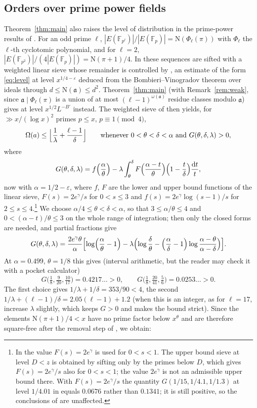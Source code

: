 \documentclass[11pt]{amsart}
\theoremstyle{remark}
\newcommand{\F}{\mathbb{F}}
\newcommand{\N}{\mathrm{N}}
\newcommand{\fa}{\mathfrak{a}}
\newcommand{\dd}{\mathrm{d}}
\newcommand{\e}{\varepsilon}
\begin{document}
\subsection{Orders over prime power fields}
Theorem~\ref{thm:main} also raises the level of distribution in the prime-power results of \cite{Xie}. For an odd prime $\ell$, $|E(\F_{p^\ell})|/|E(\F_p)|=\N(\Phi_\ell(\pi))$ with $\Phi_\ell$ the $\ell$-th cyclotomic polynomial, and for $\ell=2$, $|E(\F_{p^2})|/(4|E(\F_p)|)=\N(\pi+1)/4$. In \cite[\S4]{Xie} these sequences are sifted with a weighted linear sieve whose remainder is controlled by \cite[(4.6)]{Xie}, an estimate of the form \eqref{eq:level} at level $x^{1/4-\e}$ deduced from the Bombieri--Vinogradov theorem over ideals \cite[(4.3)]{Xie} through $d\le\N(\fa)\le d^2$. Theorem~\ref{thm:main} (with Remark~\ref{rem:weak}, since $\fa\mid\Phi_\ell(\pi)$ is a union of at most $(\ell-1)^{\omega(\fa)}$ residue classes modulo $\fa$) gives \cite[(4.6)]{Xie} at level $x^{1/2}L^{-B'}$ instead. The weighted sieve of \cite[(4.7)--(4.9)]{Xie} then yields, for $\gg x/(\log x)^2$ primes $p\le x$, $p\equiv1\pmod 4$,
\[
\Omega(a)\le\Bigl\lfloor\frac1\lambda+\frac{\ell-1}{\delta}\Bigr\rfloor\qquad\text{whenever }0<\theta<\delta<\alpha\text{ and } G(\theta,\delta,\lambda)>0,
\]
where
\[
G(\theta,\delta,\lambda)=f\Bigl(\frac\alpha\theta\Bigr)-\lambda\int_\theta^\delta F\Bigl(\frac{\alpha-t}{\theta}\Bigr)\Bigl(1-\frac t\delta\Bigr)\frac{\dd t}{t},
\]
now with $\alpha=1/2-\e$, where $f$, $F$ are the lower and upper bound functions of the linear sieve, $F(s)=2e^\gamma/s$ for $0<s\le3$ and $f(s)=2e^\gamma\log(s-1)/s$ for $2\le s\le 4$.\footnote{In \cite[(4.11)]{Xie} the value $F(s)=2e^{\gamma}$ is used for $0<s<1$. The upper bound sieve at level $D<z$ is obtained by sifting only by the primes below $D$, which gives $F(s)=2e^{\gamma}/s$ also for $0<s<1$; the value $2e^\gamma$ is not an admissible upper bound there. With $F(s)=2e^\gamma/s$ the quantity $G(1/15,1/4.1,1/1.3)$ at level $1/4.01$ in \cite{Xie} equals $0.0676$ rather than $0.1341$; it is still positive, so the conclusions of \cite[\S4]{Xie} are unaffected.} We choose $\alpha/4\le\theta<\delta<\alpha$, so that $3\le\alpha/\theta\le4$ and $0<(\alpha-t)/\theta\le3$ on the whole range of integration; then only the closed forms are needed, and partial fractions give
\[
G(\theta,\delta,\lambda)=\frac{2e^\gamma\theta}{\alpha}\Bigl[\log\Bigl(\frac\alpha\theta-1\Bigr)-\lambda\Bigl(\log\frac\delta\theta-\Bigl(\frac\alpha\delta-1\Bigr)\log\frac{\alpha-\theta}{\alpha-\delta}\Bigr)\Bigr].
\]
At $\alpha=0.499$, $\theta=1/8$ this gives (interval arithmetic, but the reader may check it with a pocket calculator)
\[
G\bigl(\tfrac18,\tfrac9{20},\tfrac{10}{17}\bigr)= 0.4217\ldots>0,\qquad G\bigl(\tfrac18,\tfrac{20}{41},\tfrac56\bigr)= 0.0253\ldots>0 .
\]
The first choice gives $1/\lambda+1/\delta=353/90<4$, the second $1/\lambda+(\ell-1)/\delta=2.05(\ell-1)+1.2$ (when this is an integer, as for $\ell=17$, increase $\lambda$ slightly, which keeps $G>0$ and makes the bound strict). Since the elements $\N(\pi+1)/4<x$ have no prime factor below $x^{\theta}$ and are therefore square-free after the removal step of \cite[p.~27]{Xie}, we obtain:
\end{document}
